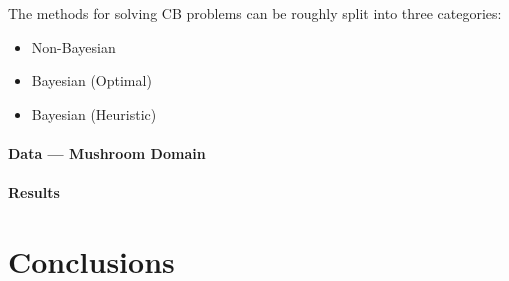 \documentclass[11pt]{article}
\begin{document}


The methods for solving CB problems can be roughly split into three
categories:
%
\begin{itemize}
  \item Non-Bayesian
  \item Bayesian (Optimal)
  \item Bayesian (Heuristic)
\end{itemize}

\paragraph{Data --- Mushroom Domain}

\paragraph{Results}

\section{Conclusions}
\end{document}
